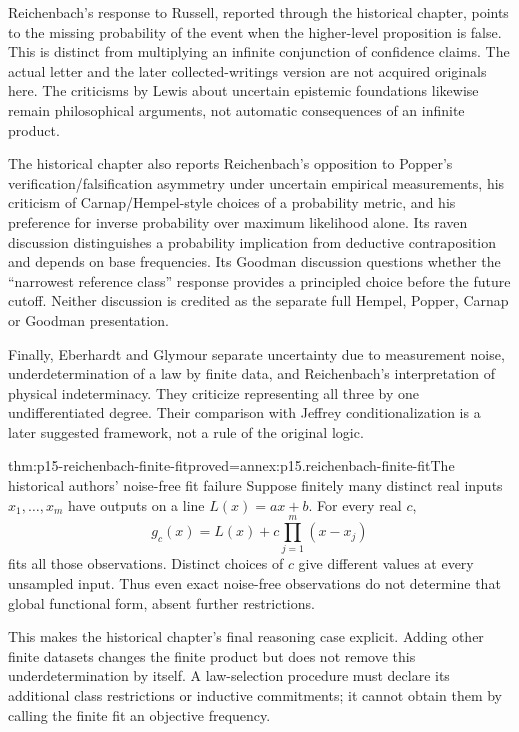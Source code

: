 Reichenbach's response to Russell, reported through the historical
chapter, points to the missing probability of the event when the
higher-level proposition is false. This is distinct from multiplying
an infinite conjunction of confidence claims. The actual letter and
the later collected-writings version are not acquired originals here.
The criticisms by Lewis about uncertain epistemic foundations likewise
remain philosophical arguments, not automatic consequences of an
infinite product.

The historical chapter also reports Reichenbach's opposition to
Popper's verification/falsification asymmetry under uncertain empirical
measurements, his criticism of Carnap/Hempel-style choices of a
probability metric, and his preference for inverse probability over
maximum likelihood alone. Its raven discussion distinguishes a
probability implication from deductive contraposition and depends on
base frequencies. Its Goodman discussion questions whether the
``narrowest reference class'' response provides a principled choice
before the future cutoff. Neither discussion is credited as the
separate full Hempel, Popper, Carnap or Goodman presentation.

Finally, Eberhardt and Glymour separate uncertainty due to measurement
noise, underdetermination of a law by finite data, and Reichenbach's
interpretation of physical indeterminacy. They criticize representing
all three by one undifferentiated degree. Their comparison with Jeffrey
conditionalization is a later suggested framework, not a rule of the
original logic.

\begin{hbtheorem}{thm:p15-reichenbach-finite-fit}{proved=annex:p15.reichenbach-finite-fit}{The historical authors' noise-free fit failure}
Suppose finitely many distinct real inputs \(x_1,\ldots,x_m\)
have outputs on a line \(L(x)=ax+b\). For every real \(c\),
\[
 g_c(x)=L(x)+c\prod_{j=1}^m(x-x_j)
\]
fits all those observations. Distinct choices of \(c\) give different
values at every unsampled input. Thus even exact noise-free observations
do not determine that global functional form, absent further restrictions.
\end{hbtheorem}

This makes the historical chapter's final reasoning case explicit.
Adding other finite datasets changes the finite product but does not
remove this underdetermination by itself. A law-selection procedure
must declare its additional class restrictions or inductive commitments;
it cannot obtain them by calling the finite fit an objective frequency.

